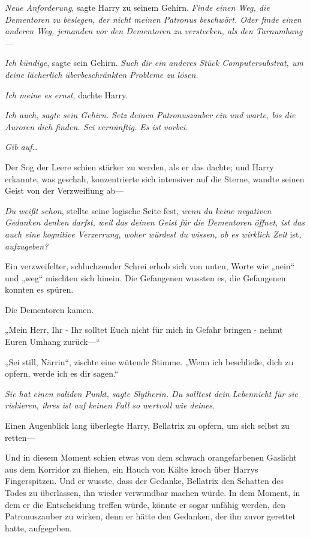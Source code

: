{\emph{Neue Anforderung}, sagte Harry zu seinem Gehirn. \emph{Finde einen Weg, die Dementoren zu besiegen, der nicht meinen Patronus beschwört. Oder finde einen anderen Weg, jemanden vor den Dementoren zu verstecken, als den Tarnumhang}—

\emph{Ich kündige}, sagte sein Gehirn. \emph{Such dir ein anderes Stück Computersubstrat, um deine lächerlich überbeschränkten Probleme zu lösen.}

\emph{Ich meine es ernst,} dachte Harry.

\emph{\emph{Ich auch}, sagte sein Gehirn. \emph{Setz deinen} \emph{Patronuszauber} \emph{ein und warte, bis die Auroren dich finden. Sei vernünftig. Es ist vorbei.}}

\emph{Gib auf…}

Der Sog der Leere schien stärker zu werden, als er das dachte; und Harry erkannte, was geschah, konzentrierte sich intensiver auf die Sterne, wandte seinen Geist von der Verzweiflung ab—

\emph{Du weißt schon}, stellte seine logische Seite fest, \emph{wenn du keine negativen Gedanken denken darfst, weil das deinen Geist für die Dementoren öffnet, ist das auch eine kognitive Verzerrung, woher würdest du wissen, ob es wirklich Zeit} ist\emph{, aufzugeben?}

Ein verzweifelter, schluchzender Schrei erhob sich von unten, Worte wie „nein“ und „weg“ mischten sich hinein. Die Gefangenen wussten es, die Gefangenen konnten es spüren.

Die Dementoren kamen.

„Mein Herr, Ihr - Ihr solltet Euch nicht für mich in Gefahr bringen - nehmt Euren Umhang zurück—“

„Sei still, Närrin“, zischte eine wütende Stimme. „Wenn ich beschließe, dich zu opfern, werde ich es dir sagen.“

\emph{\emph{Sie hat einen validen Punkt}, sagte Slytherin. \emph{Du solltest} \emph{dein Leben}nicht \emph{für sie riskieren, ihres} \emph{ist auf keinen Fall so wertvoll wie deines.}}

Einen Augenblick lang überlegte Harry, Bellatrix zu opfern, um sich selbst zu retten—

Und in diesem Moment schien etwas von dem schwach orangefarbenen Gaslicht aus dem Korridor zu fliehen, ein Hauch von Kälte kroch über Harrys Fingerspitzen. Und er wusste, dass der Gedanke, Bellatrix den Schatten des Todes zu überlassen, ihn wieder verwundbar machen würde. In dem Moment, in dem er die Entscheidung treffen würde, könnte er sogar unfähig werden, den Patronuszauber zu wirken, denn er hätte den Gedanken, der ihn zuvor gerettet hatte, aufgegeben.

}
